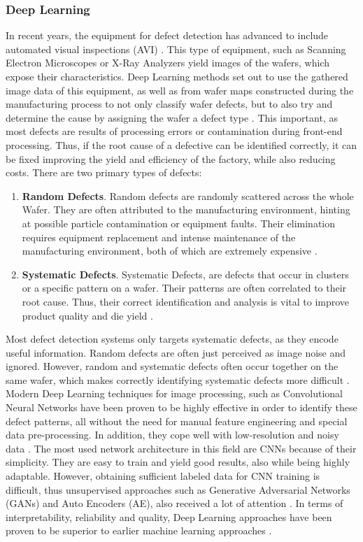 \documentclass{Academic}
\begin{document}
    \subsubsection{Deep Learning}
    In recent years, the equipment for defect detection has advanced to include automated visual inspections (AVI) \cite{batool_systematic_2021}. This type of equipment, such as Scanning Electron Microscopes or X-Ray Analyzers yield images of the wafers, which expose their characteristics. Deep Learning methods set out to use the gathered image data of this equipment, as well as from wafer maps constructed during the manufacturing process to not only classify wafer defects, but to also try and determine the cause by assigning the wafer a defect type \cite{batool_systematic_2021,yuan-fu_deep_2019-1}. This important, as most defects are results of processing errors or contamination during front-end processing. Thus, if the root cause of a defective can be identified correctly, it can be fixed improving the yield and efficiency of the factory, while also reducing costs. There are two primary types of defects:
    \begin{enumerate}
        \item \textbf{Random Defects}. Random defects are randomly scattered across the whole Wafer. They are often attributed to the manufacturing environment, hinting at possible particle contamination or equipment faults. Their elimination requires equipment replacement and intense maintenance of the manufacturing environment, both of which are extremely expensive \cite{batool_systematic_2021}.
        \item \textbf{Systematic Defects}. Systematic Defects, are defects that occur in clusters or a specific pattern on a wafer. Their patterns are often correlated to their root cause. Thus, their correct identification and analysis is vital to improve product quality and die yield \cite{batool_systematic_2021}.
    \end{enumerate}
    Most defect detection systems only targets systematic defects, as they encode useful information. Random defects are often just perceived as image noise and ignored. However, random and systematic defects often occur together on the same wafer, which makes correctly identifying systematic defects more difficult \cite{batool_systematic_2021}. Modern Deep Learning techniques for image processing, such as Convolutional Neural Networks have been proven to be highly effective in order to identify these defect patterns, all without the need for manual feature engineering and special data pre-processing. In addition, they cope well with low-resolution and noisy data \cite{batool_systematic_2021}. The most used network architecture in this field are CNNs because of their simplicity. They are easy to train and yield good results, also while being highly adaptable. However, obtaining sufficient labeled data for CNN training is difficult, thus unsupervised approaches such as Generative Adversarial Networks (GANs) and Auto Encoders (AE), also received a lot of attention \cite{batool_systematic_2021}. In terms of interpretability, reliability and quality, Deep Learning approaches have been proven to be superior to earlier machine learning approaches \cite{batool_systematic_2021}.
\end{document}
